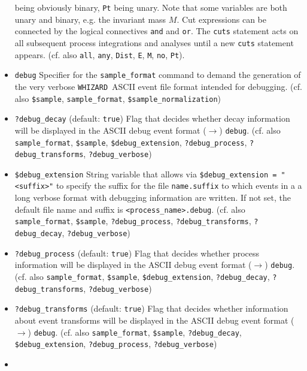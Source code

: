 \documentclass[12pt]{book}
\newcommand{\ttt}[1]{\texttt{#1}}
\newcommand{\whizard}{\texttt{WHIZARD}}
\begin{document}
\begin{itemize}
being obviously binary, \ttt{Pt} being unary. Note that some variables
are both unary and binary, e.g. the invariant mass $M$. Cut
expressions can be connected by the logical  connectives \ttt{and} and
\ttt{or}. The \ttt{cuts} statement acts on all subsequent process
integrations and analyses until a new \ttt{cuts} statement appears.
(cf. also \ttt{all}, \ttt{any},
\ttt{Dist}, \ttt{E}, \ttt{M}, 
\ttt{no}, \ttt{Pt}).
\item
\ttt{debug} \newline 
Specifier for the \ttt{sample\_format} command to demand the
generation of the very verbose \whizard\ ASCII event
file format intended for debugging. (cf. also \ttt{\$sample}, 
\ttt{sample\_format}, \ttt{\$sample\_normalization}) 
\item
\ttt{?debug\_decay} \qquad (default: \ttt{true}) \newline
Flag that decides whether decay information will be displayed in the
ASCII debug event format ($\to$) \ttt{debug}. (cf. also \ttt{sample\_format},
\ttt{\$sample}, \ttt{\$debug\_extension}, \ttt{?debug\_process},
\ttt{?debug\_transforms}, \ttt{?debug\_verbose})  
\item
\ttt{\$debug\_extension} \newline
String variable that allows via \ttt{\$debug\_extension = "<suffix>"} to 
specify the suffix for the file \ttt{name.suffix} to which events in a
a long verbose format with debugging information are written. If not
set, the default file name and suffix is
\ttt{<process\_name>.debug}. (cf. also \ttt{sample\_format},
\ttt{\$sample}, \ttt{?debug\_process}, \ttt{?debug\_transforms},
\ttt{?debug\_decay}, \ttt{?debug\_verbose})  
\item
\ttt{?debug\_process} \qquad (default: \ttt{true}) \newline
Flag that decides whether process information will be displayed in the
ASCII debug event format ($\to$) \ttt{debug}. (cf. also \ttt{sample\_format},
\ttt{\$sample}, \ttt{\$debug\_extension}, \ttt{?debug\_decay},
\ttt{?debug\_transforms}, \ttt{?debug\_verbose})  
\item
\ttt{?debug\_transforms} \qquad (default: \ttt{true}) \newline
Flag that decides whether information about event transforms will be
displayed in the ASCII debug event format ($\to$)
\ttt{debug}. (cf. also \ttt{sample\_format}, 
\ttt{\$sample}, \ttt{?debug\_decay}, \ttt{\$debug\_extension}, 
\ttt{?debug\_process}, \ttt{?debug\_verbose})  
\item

\end{itemize}
\end{document}
